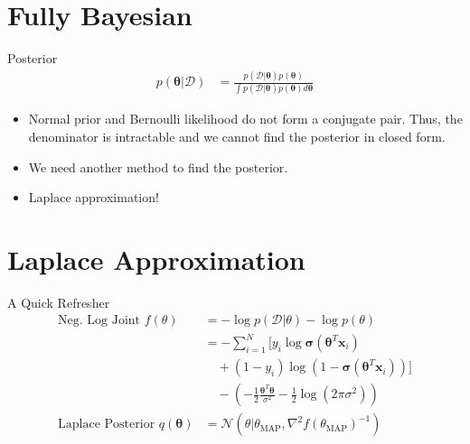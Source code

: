 \documentclass{beamer}
\newcommand{\data}{\mathcal{D}}
\begin{document}

\section{Fully Bayesian}

\begin{frame}{Posterior}
    \begin{align*}
        p(\boldsymbol{\theta} | \data) & = \frac{p(\data | \boldsymbol{\theta}) p(\boldsymbol{\theta})}{\int p(\data | \boldsymbol{\theta}) p(\boldsymbol{\theta}) d\boldsymbol{\theta}}
    \end{align*}
    \begin{itemize}
        \item Normal prior and Bernoulli likelihood do not form a conjugate pair. Thus, the denominator is intractable and we cannot find the posterior in closed form.
              \pause
        \item We need another method to find the posterior.
              \pause
        \item Laplace approximation!
    \end{itemize}
\end{frame}

\section{Laplace Approximation}

\begin{frame}{A Quick Refresher}
    \begin{align*}
        \text{Neg. Log Joint } f(\theta)                 & = -\log p(\data | \theta) - \log p(\theta)                                                                                        \\
                                                         & = -\sum_{i=1}^N \Big[y_i \log \boldsymbol{\sigma}\left(\boldsymbol{\theta}^T\boldsymbol{x}_i\right)                               \\
                                                         & \quad + (1 - y_i) \log \left(1 - \boldsymbol{\sigma}\left(\boldsymbol{\theta}^T\boldsymbol{x}_i\right)\right)\Big]                \\
                                                         & \quad  - \left( - \frac{1}{2} \frac{\boldsymbol{\theta}^T\boldsymbol{\theta}}{\sigma^2} - \frac{1}{2}\log (2 \pi \sigma^2)\right) \\
        \text{Laplace Posterior } q(\boldsymbol{\theta}) & = \mathcal{N}(\theta | \theta_{\text{MAP}}, \nabla^2 f(\theta_{\text{MAP}})^{-1})                                                 \\
    \end{align*}
\end{frame}
\end{document}
